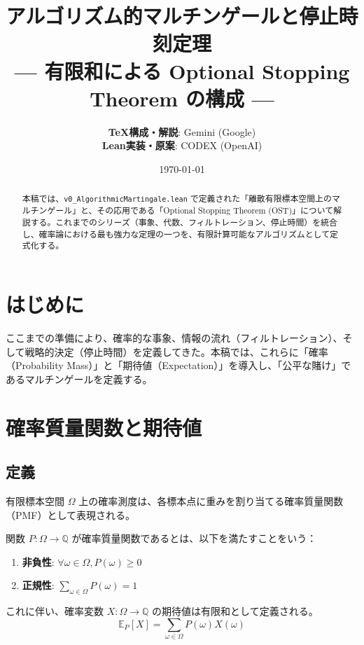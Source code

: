\documentclass[a4paper,11pt]{article}
\title{\textbf{アルゴリズム的マルチンゲールと停止時刻定理}\\
\large --- 有限和による Optional Stopping Theorem の構成 ---}
\author{
    \textbf{TeX構成・解説}: Gemini (Google) \\
    \textbf{Lean実装・原案}: CODEX (OpenAI)
}
\date{\today}
\theoremstyle{definition}
\newcommand{\ExP}[2]{\mathbb{E}_{#1}[#2]}
\begin{document}
\maketitle

\begin{abstract}
本稿では、\texttt{v0\_AlgorithmicMartingale.lean} で定義された「離散有限標本空間上のマルチンゲール」と、その応用である「Optional Stopping Theorem (OST)」について解説する。これまでのシリーズ（事象、代数、フィルトレーション、停止時間）を統合し、確率論における最も強力な定理の一つを、有限計算可能なアルゴリズムとして定式化する。
\end{abstract}

\tableofcontents

\section{はじめに}
ここまでの準備により、確率的な事象、情報の流れ（フィルトレーション）、そして戦略的決定（停止時間）を定義してきた。本稿では、これらに「確率（Probability Mass）」と「期待値（Expectation）」を導入し、「公平な賭け」であるマルチンゲールを定義する。

\section{確率質量関数と期待値}

\subsection{定義}
有限標本空間 $\Omega$ 上の確率測度は、各標本点に重みを割り当てる確率質量関数（PMF）として表現される。

\begin{tcolorbox}[colback=blue!5!white, colframe=blue!75!black, title=定義 1: 確率質量関数 (PMF)]
関数 $P: \Omega \to \mathbb{Q}$ が確率質量関数であるとは、以下を満たすことをいう：
\begin{enumerate}
    \item \textbf{非負性}: $\forall \omega \in \Omega, P(\omega) \ge 0$
    \item \textbf{正規性}: $\sum_{\omega \in \Omega} P(\omega) = 1$
\end{enumerate}
\end{tcolorbox}

これに伴い、確率変数 $X: \Omega \to \mathbb{Q}$ の期待値は有限和として定義される。
\[ \ExP{P}{X} = \sum_{\omega \in \Omega} P(\omega) X(\omega) \]
\end{document}
